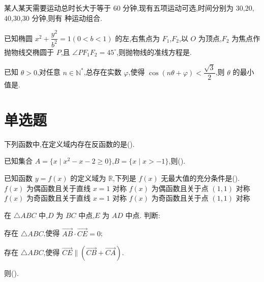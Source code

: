 \begin{problem}
某人某天需要运动总时长大于等于 \(60\) 分钟,现有五项运动可选,时间分别为 \(30\),\(20\),\(40\),\(30\),\(30\) 分钟,则有\fillinblank{} 种运动组合.
\end{problem}

\begin{problem}
已知椭圆 \(x^2+\dfrac{y^2}{b^2}=1(0<b<1)\) 的左,右焦点为 \(F_1\),\(F_2\),以 \(O\) 为顶点,\(F_2\) 为焦点作抛物线交椭圆于 \(P\),且 \(\angle PF_1F_2=45^\circ\),则抛物线的准线方程是\fillinblank{}.
\end{problem}

\begin{problem}
已知 \(\theta>0\),对任意 \(n\in\mathbb N^*\),总存在实数 \(\varphi\),使得 \(\cos(n\theta+\varphi)<\dfrac{\sqrt3}{2}\),则 \(\theta\) 的最小值是\fillinblank{}.
\end{problem}

\section{单选题}

\begin{problem}
下列函数中,在定义域内存在反函数的是(\quad).
\end{problem}

\begin{problem}
已知集合 \(A=\{x\mid x^2-x-2\ge0\}\),\(B=\{x\mid x>-1\}\),则(\quad).
\end{problem}

\begin{problem}
已知函数 \(y=f(x)\) 的定义域为 \(\mathbb R\),下列是 \(f(x)\) 无最大值的充分条件是(\quad).
\choices
    {\(f(x)\) 为偶函数且关于直线 \(x=1\) 对称}
    {\(f(x)\) 为偶函数且关于点 \((1,1)\) 对称}
    {\(f(x)\) 为奇函数且关于直线 \(x=1\) 对称}
    {\(f(x)\) 为奇函数且关于点 \((1,1)\) 对称}
\end{problem}

\begin{problem}
在 \(\triangle ABC\) 中,\(D\) 为 \(BC\) 中点,\(E\) 为 \(AD\) 中点. 判断:
\begin{circlelist}
\item 存在 \(\triangle ABC\),使得 \(\overrightarrow{AB}\cdot\overrightarrow{CE}=0\);
\item 存在 \(\triangle ABC\),使得 \(\overrightarrow{CE}\parallel(\overrightarrow{CB}+\overrightarrow{CA})\).
\end{circlelist}
则(\quad).
\end{problem}

